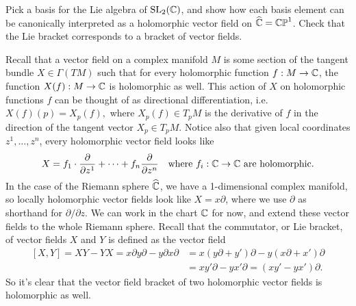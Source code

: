 \documentclass{pset}
\begin{document}
\begin{problem}{2.25}
  Pick a basis for the Lie algebra of $\mathrm{SL}_2(\mathbb{C})$, and show how each basis element can be canonically interpreted as a holomorphic vector field on $\widehat{\mathbb{C}} = \mathbb{CP}^1$. Check that the Lie bracket corresponds to a bracket of vector fields.
\end{problem}

\begin{solution}
  Recall that a vector field on a complex manifold $M$ is some section of the tangent bundle $X\in \Gamma(TM)$ such that for every holomorphic function $f : M \to \mathbb{C}$, the function $X(f) : M \to \mathbb{C}$ is holomorphic as well. This action of $X$ on holomorphic functions $f$ can be thought of as directional differentiation, i.e. 
  $X(f)(p) = X_p(f),$ where $X_p(f)\in T_pM$ is the derivative of $f$ in the direction of the tangent vector $X_p\in T_pM$. Notice also that given local coordinates $z^1,\ldots, z^n$, every holomorphic vector field looks like
  \[
    X = f_1\cdot \frac{\partial}{\partial z^1} + \cdots + f_n\frac{\partial}{\partial z^n}\quad \textrm{where } f_i : \mathbb{C} \to \mathbb{C} \textrm{ are holomorphic.}
  \]
  In the case of the Riemann sphere $\widehat{\mathbb{C}}$, we have a 1-dimensional complex manifold, so locally holomorphic vector fields look like $X = x\partial$, where we use $\partial$ as shorthand for $\partial / \partial z$. We can work in the chart $\mathbb{C}$ for now, and extend these vector fields to the whole Riemann sphere. Recall that the commutator, or Lie bracket, of vector fields $X$ and $Y$ is defined as the vector field
  \[
    \begin{aligned}
      [X, Y] = XY - YX = x\partial y \partial - y\partial x\partial &= x(y\partial + y')\partial - y(x\partial + x')\partial\\
                                                                                 &= xy'\partial - yx'\partial= (xy'-yx')\partial.
    \end{aligned}
  \]
  So it's clear that the vector field bracket of two holomorphic vector fields is holomorphic as well.


\end{solution}
\end{document}
